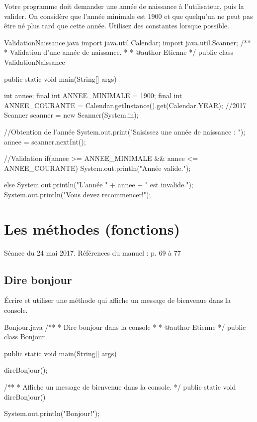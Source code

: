 \documentclass[12pt]{article}
\begin{document}
Votre programme doit demander une année de naissance à l'utilisateur, puis la valider. On considère que l'année minimale est 1900 et que quelqu'un ne peut pas être né plus tard que cette année. Utilisez des constantes lorsque possible.

\begin{MyTCB}{ValidationNaissance.java}
import java.util.Calendar;
import java.util.Scanner;
/**
 * Validation d'une année de naissance.
 * 
 * @author Etienne
 */
public class ValidationNaissance {

	public static void main(String[] args) {
		
		int annee;
		final int ANNEE_MINIMALE = 1900;
		final int ANNEE_COURANTE = Calendar.getInstance().get(Calendar.YEAR); //2017
		Scanner scanner = new Scanner(System.in);
		
		
		//Obtention de l'année
		System.out.print("Saisissez une année de naissance : ");
		annee = scanner.nextInt();
		
		
		//Validation
		if(annee >= ANNEE_MINIMALE && annee <= ANNEE_COURANTE)
			System.out.println("Année valide.");
		
		else {
			System.out.println("L'année " + annee + " est invalide.");
			System.out.println("Vous devez recommencer!");
		}

	}

}
\end{MyTCB}




\section{Les méthodes (fonctions)}
\vspace*{-\baselineskip}
Séance du 24 mai 2017. Références du manuel : p. 69 à 77

\subsection{Dire bonjour}

Écrire et utiliser une méthode qui affiche un message de bienvenue dans la console.

\begin{MyTCB}{Bonjour.java}
/**
 * Dire bonjour dans la console
 *
 * @author Etienne
 */
public class Bonjour {

	public static void main(String[] args) {
		
		direBonjour();
		
	}
	
	
	/**
	 * Affiche un message de bienvenue dans la console.
	 */
	public static void direBonjour() {
		
		System.out.println("Bonjour!");
		
	}
	
}

\end{MyTCB}
\end{document}
